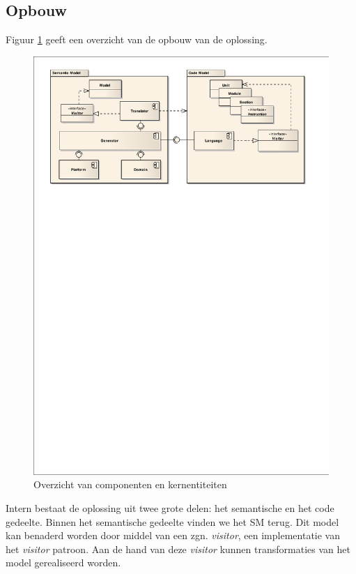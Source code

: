 
\subsection{Opbouw}

Figuur \ref{fig:devel-component-overview} geeft een overzicht van de opbouw van
de oplossing.

\begin{figure}[ht]
  \centering
  \includegraphics[width=\linewidth]{resources/component-overview.pdf}
  \caption{Overzicht van componenten en kernentiteiten}
  \label{fig:devel-component-overview}
\end{figure}

Intern bestaat de oplossing uit twee grote delen: het semantische en het code
gedeelte. Binnen het semantische gedeelte vinden we het SM terug. Dit model kan
benaderd worden door middel van een zgn. \emph{visitor}, een implementatie van
het \emph{visitor} patroon. Aan de hand van deze \emph{visitor} kunnen
transformaties van het model gerealiseerd worden.

